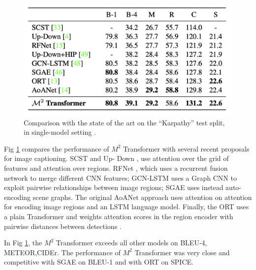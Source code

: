 \documentclass[
]{krantz}
\begin{document}
\begin{figure}

{\centering \includegraphics[width=1\linewidth]{figures/02-01/02-02 compare2} 

}

\caption{Comparison with the state of the art on the ``Karpathy'' test split, in single-model setting \citep{cornia2020m2}.}\label{fig:compare2}
\end{figure}



Fig \ref{fig:compare2} compares the performance of \(M^2\) Transformer with several recent proposals for image captioning.
SCST \citep{8099614} and Up- Down \citep{8578734}, use attention over the grid of features and attention over regions. RFNet \citep{renet}, which uses a recurrent fusion network to merge different CNN features; GCN-LSTM \citep{GCN-LSTM} uses a Graph CNN to exploit pairwise relationships between image regions; SGAE \citep{Yang_2019_CVPR} uses instead auto-encoding scene graphs. The original AoANet \citep{huang1} approach uses attention on attention for encoding image regions and an LSTM language model. Finally, the ORT \citep{HerdadeKBS19} uses a plain Transformer and weights attention scores in the region encoder with pairwise distances between detections \citep{cornia2020m2}.

In Fig \ref{fig:compare2}, the \(M^2\) Transformer exceeds all other models on BLEU-4, METEOR,CIDEr. The performance of \(M^2\) Transformer was very close and competitive with SGAE on BLEU-1 and with ORT on SPICE.
\end{document}
